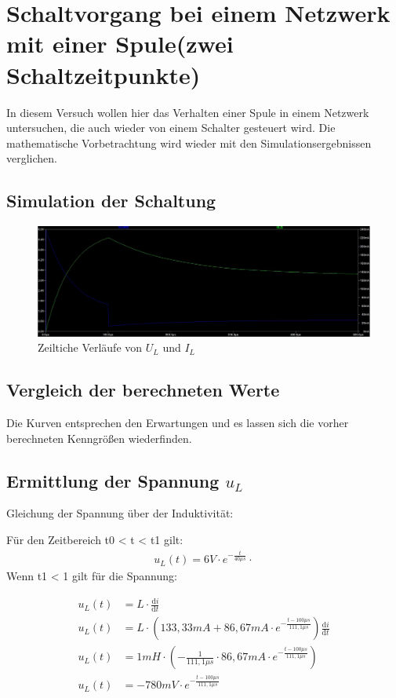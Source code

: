 \documentclass{article}
\begin{document}
\newpage


\section{Schaltvorgang bei einem Netzwerk mit einer Spule(zwei Schaltzeitpunkte)}
\begin{task}
  In diesem Versuch wollen hier das Verhalten einer Spule in einem Netzwerk untersuchen, die auch wieder von einem Schalter gesteuert wird. Die mathematische Vorbetrachtung wird wieder mit den Simulationsergebnissen verglichen.


\end{task}

\subsection{Simulation der Schaltung}
\begin{figure}[h]
  \begin{center}
    \includegraphics[scale=0.4]{../assets/images/ET2P5/aufgabe 3 u von t und i von t.JPG}
    \caption{Zeiltiche Verläufe von $U_L$ und $I_L$}
  \end{center}
\end{figure}

\subsection{Vergleich der berechneten Werte}

Die Kurven entsprechen den Erwartungen und es lassen sich die vorher berechneten Kenngrößen wiederfinden.

\subsection{Ermittlung der Spannung $u_L$}

Gleichung der Spannung über der Induktivität:

Für den Zeitbereich t0 < t < t1 gilt:
\begin{align*}
  u_L(t) = 6V\cdot e^{-\frac{t}{40\mu s}}\cdot 
\end{align*}
Wenn t1 < 1 gilt für die Spannung:

\begin{align*}
  u_L(t) &= L\cdot \frac{\mathrm{d} i}{\mathrm{d} t}\\
  u_L(t) &= L\cdot (133,33mA + 86,67mA\cdot e^{-\frac{t-100\mu s}{111,1\mu s}})\frac{\mathrm{d} i}{\mathrm{d} t}\\
  u_L(t) &= 1mH\cdot \left(-\frac{1}{111,1\mu s}\cdot 86,67mA\cdot e^{-\frac{t-100\mu s}{111,1\mu s}}\right)\\
  u_L(t) &= -780mV\cdot e^{-\frac{t-100\mu s}{111,1\mu s}}
\end{align*}
\newpage
\end{document}
